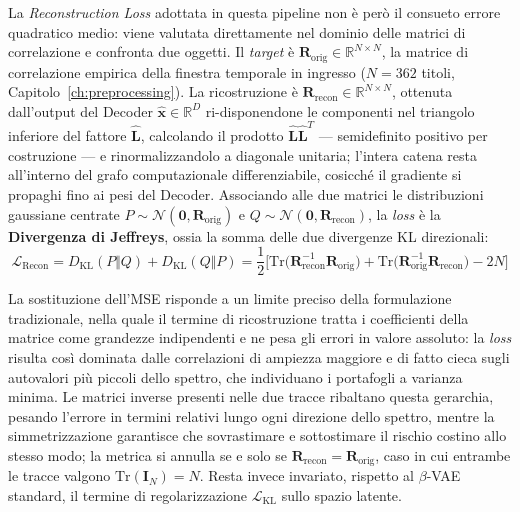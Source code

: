 La \emph{Reconstruction Loss} adottata in questa pipeline non è però il consueto errore quadratico medio: viene valutata direttamente nel dominio delle matrici di correlazione e confronta due oggetti. Il \emph{target} è $\mathbf{R}_{\text{orig}} \in \mathbb{R}^{N \times N}$, la matrice di correlazione empirica della finestra temporale in ingresso ($N=362$ titoli, Capitolo~\ref{ch:preprocessing}). La ricostruzione è $\mathbf{R}_{\text{recon}} \in \mathbb{R}^{N \times N}$, ottenuta dall'output del Decoder $\hat{\mathbf{x}} \in \mathbb{R}^{D}$ ri-disponendone le componenti nel triangolo inferiore del fattore $\hat{\mathbf{L}}$, calcolando il prodotto $\hat{\mathbf{L}}\hat{\mathbf{L}}^{T}$ --- semidefinito positivo per costruzione --- e rinormalizzandolo a diagonale unitaria; l'intera catena resta all'interno del grafo computazionale differenziabile, cosicché il gradiente si propaghi fino ai pesi del Decoder. Associando alle due matrici le distribuzioni gaussiane centrate $P \sim \mathcal{N}(\mathbf{0}, \mathbf{R}_{\text{orig}})$ e $Q \sim \mathcal{N}(\mathbf{0}, \mathbf{R}_{\text{recon}})$, la \emph{loss} è la \textbf{Divergenza di Jeffreys}, ossia la somma delle due divergenze KL direzionali:
\begin{equation}
\mathcal{L}_{\text{Recon}} = D_{\text{KL}}(P \Vert Q) + D_{\text{KL}}(Q \Vert P) = \frac{1}{2}\Big[\mathrm{Tr}\big(\mathbf{R}_{\text{recon}}^{-1}\mathbf{R}_{\text{orig}}\big) + \mathrm{Tr}\big(\mathbf{R}_{\text{orig}}^{-1}\mathbf{R}_{\text{recon}}\big) - 2N\Big]
\end{equation}

La sostituzione dell'MSE risponde a un limite preciso della formulazione tradizionale, nella quale il termine di ricostruzione tratta i coefficienti della matrice come grandezze indipendenti e ne pesa gli errori in valore assoluto: la \emph{loss} risulta così dominata dalle correlazioni di ampiezza maggiore e di fatto cieca sugli autovalori più piccoli dello spettro, che individuano i portafogli a varianza minima. Le matrici inverse presenti nelle due tracce ribaltano questa gerarchia, pesando l'errore in termini relativi lungo ogni direzione dello spettro, mentre la simmetrizzazione garantisce che sovrastimare e sottostimare il rischio costino allo stesso modo; la metrica si annulla se e solo se $\mathbf{R}_{\text{recon}} = \mathbf{R}_{\text{orig}}$, caso in cui entrambe le tracce valgono $\mathrm{Tr}(\mathbf{I}_N) = N$. Resta invece invariato, rispetto al $\beta$-VAE standard, il termine di regolarizzazione $\mathcal{L}_{\text{KL}}$ sullo spazio latente.

